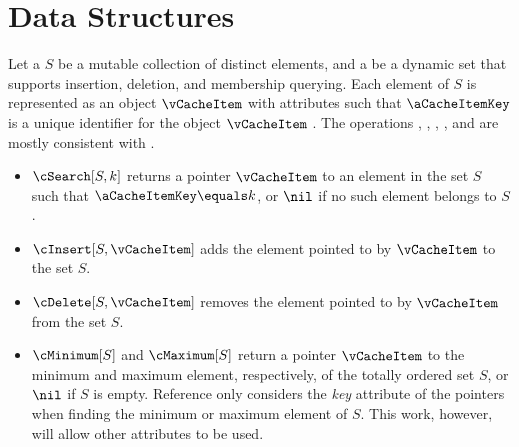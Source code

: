\chapter{Data Structures}

\newcommand{\dset}{S}

Let a  $\dset$ be a mutable collection of distinct elements, and a  be a dynamic set that supports insertion, deletion, and membership querying. Each element of $\dset$ is represented as an object $\vCacheItem$ with attributes such that $\aCacheItemKey$ is a unique identifier for the object $\vCacheItem$ \cite[p. 249]{Cormen2022}. The operations \cSearch, \cInsert, \cDelete, \cMinimum, and \cMaximum{} are mostly consistent with \cite[p. 250]{Cormen2022}.
%
\begin{itemize}
    \item $\cSearch[S, k]$ returns a pointer $\vCacheItem$ to an element in the set $\dset$ such that $\aCacheItemKey \equals k$, or $\nil$ if no such element belongs to $\dset$.
    \item $\cInsert[\dset, \vCacheItem]$ adds the element pointed to by $\vCacheItem$ to the set $\dset$.
    \item $\cDelete[\dset, \vCacheItem]$ removes the element pointed to by $\vCacheItem$ from the set $\dset$.
    \item $\cMinimum[\dset]$ and $\cMaximum[\dset]$ return a pointer $\vCacheItem$ to the minimum and maximum element, respectively, of the totally ordered set $\dset$, or $\nil$ if $\dset$ is empty. Reference \cite{Cormen2022} only considers the \emph{key} attribute of the pointers when finding the minimum or maximum element of $\dset$. This work, however, will allow other attributes to be used.
\end{itemize}